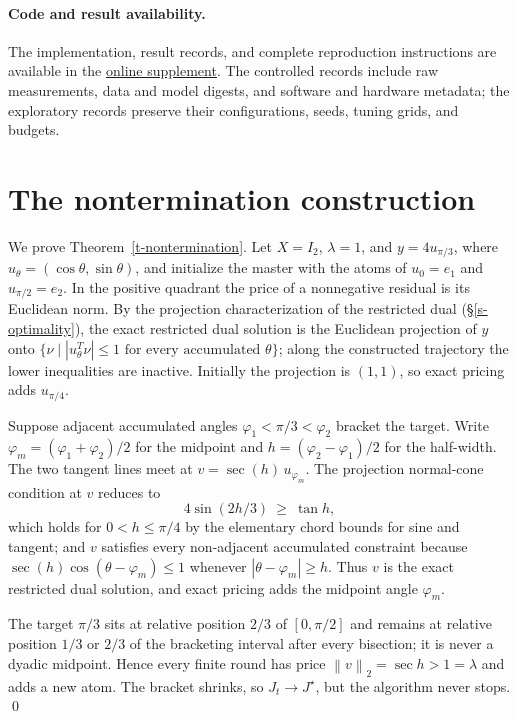 \documentclass[12pt]{article}
\theoremstyle{plain}
\theoremstyle{definition}
\newcommand{\norm}[1]{\left\lVert #1\right\rVert}
\begin{document}
\paragraph{Code and result availability.}
The implementation, result records, and complete reproduction instructions
are available in the \href{https://github.com/epicycloids/relu-chambers}{online
supplement}. The controlled records include raw measurements, data and model
digests, and software and hardware metadata; the exploratory records preserve
their configurations, seeds, tuning grids, and budgets.

\appendix

\section{The nontermination construction}\label{a-nontermination}

We prove Theorem~\ref{t-nontermination}. Let $X=I_2$, $\lambda=1$, and
$y=4u_{\pi/3}$, where $u_\theta=(\cos\theta,\sin\theta)$, and initialize the
master with the atoms of $u_0=e_1$ and $u_{\pi/2}=e_2$. In the positive
quadrant the price of a nonnegative residual is its Euclidean norm. By the
projection characterization of the restricted dual (\S\ref{s-optimality}),
the exact restricted dual solution is the Euclidean projection of $y$ onto
$\{\nu \mid |u_\theta^T\nu|\le1\text{ for every accumulated }\theta\}$; along
the constructed trajectory the lower inequalities are inactive. Initially
the projection is $(1,1)$, so exact pricing adds $u_{\pi/4}$.

Suppose adjacent accumulated angles $\varphi_1<\pi/3<\varphi_2$ bracket the
target. Write $\varphi_m=(\varphi_1+\varphi_2)/2$ for the midpoint and
$h=(\varphi_2-\varphi_1)/2$ for the half-width. The two tangent lines meet at
$v=\sec(h)\,u_{\varphi_m}$. The projection normal-cone condition at $v$
reduces to
\[
  4\sin(2h/3)\ \ge\ \tan h,
\]
which holds for $0<h\le\pi/4$ by the elementary chord bounds for sine and
tangent; and $v$ satisfies every non-adjacent accumulated constraint because
$\sec(h)\cos(\theta-\varphi_m)\le1$ whenever $|\theta-\varphi_m|\ge h$. Thus
$v$ is the exact restricted dual solution, and exact pricing adds the
midpoint angle $\varphi_m$.

The target $\pi/3$ sits at relative position $2/3$ of $[0,\pi/2]$ and remains
at relative position $1/3$ or $2/3$ of the bracketing interval after every
bisection; it is never a dyadic midpoint. Hence every finite round has price
$\norm v_2=\sec h>1=\lambda$ and adds a new atom. The bracket shrinks, so
$J_t\to J^\star$, but the algorithm never stops. \qed

\small


\end{document}
